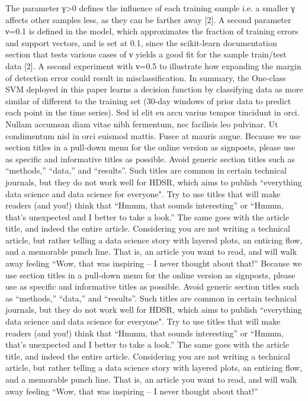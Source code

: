 \documentclass[]{hdsr}
\begin{document}
The parameter γ>0 defines the influence of each training sample i.e. a smaller γ affects other samples less, as they can be farther away [2]. A second parameter ν=0.1 is defined in the model, which approximates the fraction of training errors and support vectors, and is set at 0.1, since the scikit-learn documentation section that tests various cases of ν yields a good fit for the sample train/test data [2]. A second experiment with ν=0.5 to illustrate how expanding the margin of detection error could result in misclassification. In summary, the One-class SVM deployed in this paper learns a decision function by classifying data as more similar of different to the training set (30-day windows of prior data to predict each point in the time series).
Sed id elit eu arcu varius tempor tincidunt in orci. Nullam accumsan diam vitae nibh fermentum, nec facilisis leo pulvinar. Ut condimentum nisl in orci euismod mattis. Fusce at mauris augue. Because we use section titles in a pull-down menu for the online version as signposts, please use as specific and informative titles as possible. Avoid generic section titles such as ``methods,'' ``data,'' and ``results''. Such titles are common in certain technical journals, but they do not work well for HDSR, which aims to publish ``everything data science and data science for everyone". Try to use titles that will make readers (and you!) think that ``Hmmm, that sounds interesting'' or ``Hmmm, that's unexpected and I better to take a look.''   The same goes with the article title, and indeed the entire article.  Considering you are not writing a technical article, but rather telling a data science story with layered plots, an enticing flow, and a memorable punch line. That is, an article you want to read, and will walk away feeling ``Wow, that was inspiring -- I never thought about that!'' Because we use section titles in a pull-down menu for the online version as signposts, please use as specific and informative titles as possible. Avoid generic section titles such as ``methods,'' ``data,'' and ``results''. Such titles are common in certain technical journals, but they do not work well for HDSR, which aims to publish ``everything data science and data science for everyone". Try to use titles that will make readers (and you!) think that ``Hmmm, that sounds interesting'' or ``Hmmm, that's unexpected and I better to take a look.''   The same goes with the article title, and indeed the entire article.  Considering you are not writing a technical article, but rather telling a data science story with layered plots, an enticing flow, and a memorable punch line. That is, an article you want to read, and will walk away feeling ``Wow, that was inspiring -- I never thought about that!'' 
\end{document}
